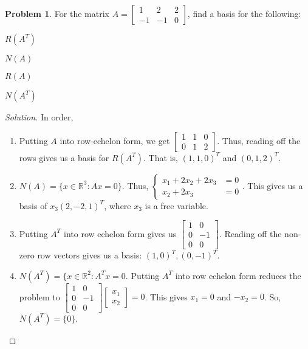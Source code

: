 \documentclass[oneside]{book}
\theoremstyle{definition}
\newtheorem{problem}{Problem}[section]
\begin{document}
\begin{problem}
For the matrix $A = \begin{bmatrix} 1 & 2 & 2 \\ -1 & -1 & 0 \end{bmatrix}$, find a basis for the following:
\begin{enumerate}
\begin{multicols}{4}
\item $R(A^T)$
\item $N(A)$
\item $R(A)$
\item $N(A^T)$
\end{multicols}
\end{enumerate}
\end{problem}
\begin{proof}[Solution] In order,
\begin{enumerate}
\item Putting $A$ into row-echelon form, we get $\begin{bmatrix} 1 & 1 & 0 \\ 0 & 1 & 2 \end{bmatrix}$. Thus, reading off the rows gives us a basis for $R(A^T)$. That is, $(1,1,0)^T$ and $(0,1,2)^T$.
\item $N(A) = \{x\in \mathbb{R}^3: Ax = 0\}$. Thus, $\begin{cases} x_1 + 2x_2 + 2x_3 &= 0  \\  x_2 + 2x_3 &= 0 \end{cases}$. This gives us a basis of $x_3(2,-2,1)^T$, where $x_3$ is a free variable.
\item Putting $A^T$ into row echelon form gives us $\begin{bmatrix} 1 & 0 \\ 0 & -1 \\ 0 & 0 \end{bmatrix}$. Reading off the non-zero row vectors gives us a basis: $(1,0)^T, (0,-1)^T$.
\item $N(A^T)= \{x\in \mathbb{R}^2: A^T x = 0$. Putting $A^T$ into row echelon form reduces the problem to $\begin{bmatrix} 1 & 0 \\ 0 & -1 \\ 0 & 0 \end{bmatrix} \begin{bmatrix} x_1 \\ x_2 \end{bmatrix} = 0$. This gives $x_1 = 0$ and $-x_2 = 0$. So, $N(A^T) = \{0\}$.
\end{enumerate}
\end{proof}
\end{document}
